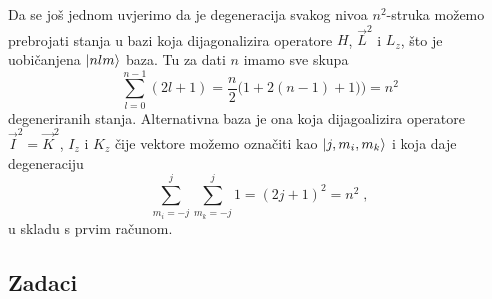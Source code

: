 Da se još jednom uvjerimo da je degeneracija
svakog nivoa $n^2$-struka  možemo prebrojati stanja u bazi koja
dijagonalizira operatore $H$, $\vec{L}^2$ i $L_z$, što je
uobičanjena $| nlm \rangle$ baza. Tu za dati $n$ imamo sve skupa
\begin{equation}
 \sum_{l=0}^{n-1} (2l+1) =\frac{n}{2}\big(1+2(n-1)+1)\big) = n^2
\end{equation}
degeneriranih stanja.
Alternativna baza je ona koja dijagoalizira operatore
$\vec{I}^2=\vec{K}^2$, $I_z$ i $K_z$ čije vektore možemo
označiti kao $| j,m_i, m_k \rangle$ i koja daje degeneraciju
\begin{equation}
    \sum_{m_i=-j}^{j}\sum_{m_k=-j}^{j} 1 = (2j+1)^2 = n^2 \;,
\end{equation}
u skladu s prvim računom.


\subsection*{Zadaci}

